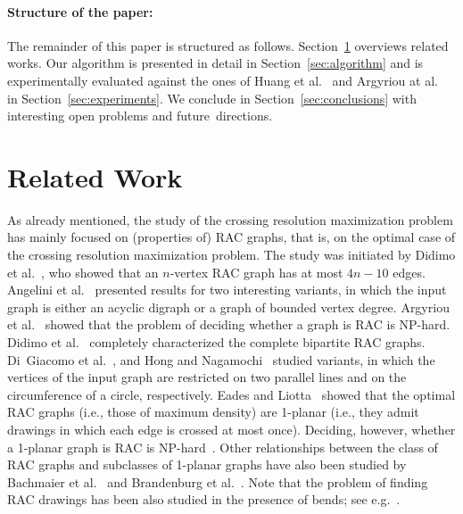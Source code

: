 \documentclass[runningheads]{llncs}
\begin{document}
\paragraph{Structure of the paper:}
The remainder of this paper is structured as follows. Section~\ref{sec:relatedwork} overviews related works. 
Our algorithm is presented in detail in Section~\ref{sec:algorithm} and is experimentally evaluated against the ones of Huang et al.~\cite{DBLP:journals/vlc/HuangEHL13} and Argyriou at al.~\cite{DBLP:journals/cj/ArgyriouBS13} in Section~\ref{sec:experiments}. We conclude in Section~\ref{sec:conclusions} with interesting open problems and future~directions.
 
\section{Related Work}
\label{sec:relatedwork}

As already mentioned, the study of the crossing resolution maximization problem has mainly focused on (properties of) RAC graphs, that is, on the optimal case of the crossing resolution maximization problem. The study was initiated by Didimo et al.~\cite{DBLP:journals/tcs/DidimoEL11}, who showed that an $n$-vertex RAC graph has at most $4n-10$ edges. 
Angelini et al.~\cite{DBLP:journals/jgaa/AngeliniCDFBKS11} presented results for two interesting variants, in which the input graph is either an acyclic digraph or a graph of bounded vertex degree. Argyriou et al.~\cite{DBLP:journals/jgaa/ArgyriouBS12} showed that the problem of deciding whether a graph is RAC is NP-hard. Didimo et al.~\cite{DBLP:journals/ipl/DidimoEL10} completely characterized the complete bipartite RAC graphs. Di~Giacomo et al.~\cite{DBLP:journals/algorithmica/GiacomoDEL14}, and Hong and Nagamochi~\cite{DBLP:conf/wg/HongN15} studied variants, in which the vertices of the input graph are restricted on two parallel lines and on the circumference of a circle, respectively. Eades and Liotta~\cite{DBLP:journals/dam/EadesL13} showed that the optimal RAC graphs (i.e., those of maximum density) are 1-planar (i.e., they admit drawings in which each edge is crossed at most once). Deciding, however, whether a 1-planar graph is RAC is NP-hard~\cite{DBLP:journals/tcs/BekosDLMM17}. Other relationships between the class of RAC graphs and subclasses of 1-planar graphs have also been studied by Bachmaier et al.~\cite{DBLP:journals/dam/BachmaierBHNR17} and Brandenburg et al.~\cite{DBLP:journals/tcs/BrandenburgDEKL16}. Note that the problem of finding RAC drawings has been also studied in the presence of bends; see e.g.~\cite{DBLP:journals/jgaa/AngeliniCDFBKS11,DBLP:journals/comgeo/ArikushiFKMT12,DBLP:journals/tcs/DidimoEL11,DBLP:journals/mst/GiacomoDLM11}. 
\end{document}
